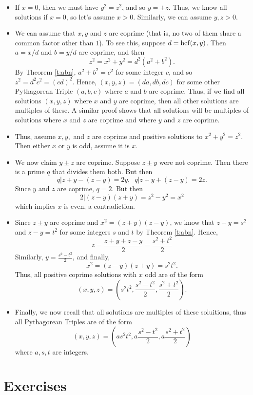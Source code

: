 \documentclass[11pt,dvipsnames]{book}
\def\hcf{{\rm hcf}}
\numberwithin{equation}{section} %
\numberwithin{figure}{section} %
\numberwithin{table}{section} %
\begin{document}
\begin{itemize}
\item If $x=0$, then we must have $y^2=z^2$, and so $y=\pm z$. Thus, we know all solutions if $x=0$, so let's assume $x> 0$. Similarly, we can assume $y,z> 0$.
\item We can assume that $x,y$ and $z$ are coprime (that is, no two of them share a common factor other than $1$). To see this, suppose $d=\hcf(x,y)$. Then $a=x/d$ and $b=y/d$ are coprime, and then
\[
z^2= x^2+y^2 = d^2(a^2+b^2).
\]
By Theorem \ref{t:abn}, $a^2+b^2=c^2$ for some integer $c$, and so $z^2=d^2 c^2=(cd)^2$. Hence, $(x,y,z)=(da,db,dc)$ for some other Pythagorean Triple $(a,b,c)$ where $a$ and $b$ are coprime.  Thus, if we find all solutions $(x,y,z)$ where $x$ and $y$ are coprime, then all other solutions are multiples of these. A similar proof shows that all solutions will be multiples of solutions where $x$ and $z$ are coprime and where $y$ and $z$ are coprime. 
\item Thus, assume $x,y,$ and $z$ are coprime and positive solutions to $x^2+y^2=z^2$. Then either $x$ or $y$ is odd, assume it is $x$. 
\item We now claim $y\pm z$ are coprime. Suppose $z\pm y$ were not coprime. Then there is a prime $q$ that divides them both. But then
\[
q|z+y-(z-y) = 2y,\;\; q| z+y+(z-y) = 2z.
\]
Since $y$ and $z$ are coprime, $q=2$. But then
\[
2|(z-y)(z+y)=z^{2}-y^{2}=x^{2}
\]
which implies $x$ is even, a contradiction.
\item Since $z\pm y$ are coprime and $x^{2}=(z+y)(z-y)$, we know that $z+y=s^{2}$ and $z-y=t^{2}$ for some integers $s$ and $t$ by Theorem \ref{t:abn}. Hence, 
\[
z=\frac{z+y+z-y}{2} = \frac{s^{2}+t^{2}}{2}
\]
Similarly, $y=\frac{s^{2}-t^{2}}{2}$, and finally,
\[
x^{2} =(z-y)(z+y) = s^{2}t^{2}. 
\]
Thus, all positive coprime solutions with $x$ odd are of the form
\[
(x,y,z) = \left( s^2 t^2, \frac{s^2-t^2}{2}, \frac{s^{2}+t^{2}}{2}\right).
\]
\item Finally, we now recall that all solutions are multiples of these soluitions, thus all Pythagorean Triples are of the form
\[
(x,y,z) = \left( as^2 t^2, a\frac{s^2-t^2}{2}, a\frac{s^{2}+t^{2}}{2}\right)
\]
where $a,s,t$ are integers. 
\end{itemize}



\section{Exercises}
\end{document}
